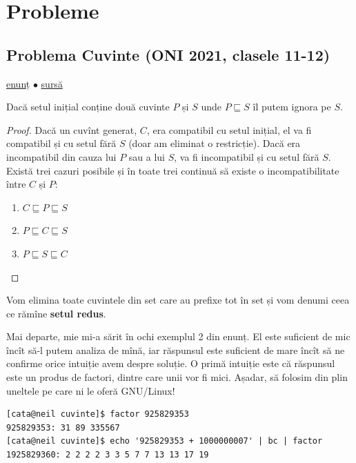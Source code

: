 \documentclass[../main.tex]{subfiles}
\begin{document}
\section{Probleme}

\subsection{Problema  Cuvinte (ONI 2021, clasele 11-12)}
\label{problem:cuvinte}

\href{https://kilonova.ro/problems/65}{enunț}
$\bullet$
\hyperref[code:cuvinte]{sursă}

\begin{remark}
  Dacă setul inițial conține două cuvinte $P$ și $S$ unde $P \sqsubseteq S$ îl putem ignora pe $S$.
\end{remark}

\begin{proof}
  Dacă un cuvînt generat, $C$, era compatibil cu setul inițial, el va fi compatibil și cu setul fără $S$ (doar am eliminat o restricție). Dacă era incompatibil din cauza lui $P$ sau a lui $S$, va fi incompatibil și cu setul fără $S$. Există trei cazuri posibile și în toate trei continuă să existe o incompatibilitate între $C$ și $P$:

  \begin{enumerate}
    \item $C \sqsubseteq P \sqsubseteq S$
    \item $P \sqsubseteq C \sqsubseteq S$
    \item $P \sqsubseteq S \sqsubseteq C$
  \end{enumerate}
\end{proof}

Vom elimina toate cuvintele din set care au prefixe tot în set și vom denumi ceea ce rămîne \textbf{setul redus}.

Mai departe, mie mi-a sărit în ochi exemplul 2 din enunț. El este suficient de mic încît să-l putem analiza de mînă, iar răspunsul este suficient de mare încît să ne confirme orice intuiție avem despre soluție. O primă intuiție este că răspunsul este un produs de factori, dintre care unii vor fi mici. Așadar, să folosim din plin uneltele pe care ni le oferă GNU/Linux! 

\begin{verbatim}
[cata@neil cuvinte]$ factor 925829353
925829353: 31 89 335567
[cata@neil cuvinte]$ echo '925829353 + 1000000007' | bc | factor
1925829360: 2 2 2 2 3 3 5 7 7 13 13 17 19
\end{verbatim}
\end{document}

